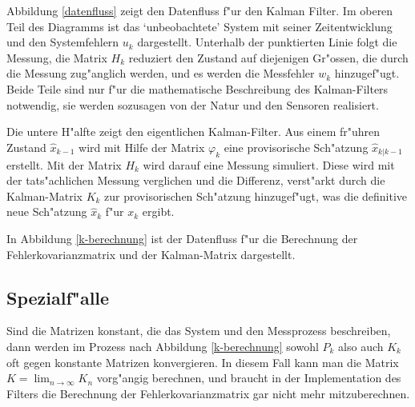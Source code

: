Abbildung \ref{datenfluss} zeigt den Datenfluss f"ur den Kalman Filter.
Im oberen Teil des Diagramms ist das `unbeobachtete' System mit seiner
Zeitentwicklung und den Systemfehlern $u_k$ dargestellt.
Unterhalb der
punktierten Linie folgt die Messung, die Matrix $H_k$ reduziert den Zustand
auf diejenigen Gr"ossen, die durch die Messung zug"anglich werden, und es
werden die Messfehler $w_k$ hinzugef"ugt.
Beide Teile sind nur f"ur die
mathematische Beschreibung des Kalman-Filters notwendig, sie werden
sozusagen von der Natur und den Sensoren realisiert.

Die untere H"alfte zeigt den eigentlichen Kalman-Filter.
Aus einem fr"uhren Zustand $\hat x_{k-1}$ wird mit Hilfe der Matrix
$\varphi_k$ eine provisorische Sch"atzung $\hat x_{k|k-1}$ erstellt.
Mit der Matrix $H_k$ wird darauf eine Messung simuliert.
Diese wird
mit der tats"achlichen Messung verglichen und die Differenz, verst"arkt durch
die Kalman-Matrix $K_k$ zur provisorischen Sch"atzung hinzugef"ugt, was
die definitive neue Sch"atzung $\hat x_k$ f"ur $x_k$ ergibt.

In Abbildung \ref{k-berechnung} ist der Datenfluss f"ur die Berechnung
der Fehlerkovarianzmatrix und der Kalman-Matrix dargestellt.

\subsection{Spezialf"alle}
Sind die Matrizen konstant, die das System und den Messprozess beschreiben, 
dann werden im Prozess nach Abbildung \ref{k-berechnung} sowohl $P_k$ also auch
$K_k$ oft gegen konstante Matrizen konvergieren.
In diesem Fall kann man
die Matrix $K=\lim_{n\to\infty}K_n$ vorg"angig berechnen, und braucht
in der Implementation des Filters die Berechnung der Fehlerkovarianzmatrix
gar nicht mehr mitzuberechnen. 

